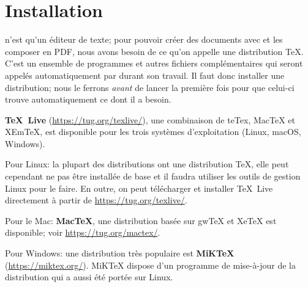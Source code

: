 
\chapter{Installation}
\label{chap.installation}

\Tw{} n'est qu'un éditeur de texte; pour pouvoir créer des documents avec \AllTeX{} et les composer en PDF, nous avons besoin de ce qu'on appelle une distribution \TeX{}. C'est un ensemble de programmes et autres fichiers complémentaires qui seront appelés automatiquement par \Tw{} durant son travail. Il faut donc installer une distribution; nous le ferrons \emph{avant} de lancer \Tw{} la première fois pour que celui-ci trouve automatiquement ce dont il a besoin.

\textbf{TeX~Live} (\url{https://tug.org/texlive/}), une combinaison de teTex, MacTeX et XEmTeX, est disponible pour les trois systèmes d'exploitation (Linux, macOS, Windows).

\begin{OSLinux}
Pour Linux: la plupart des distributions ont une distribution \TeX, elle peut cependant ne pas être installée de base et il faudra utiliser les outils de gestion Linux pour le faire. En outre, on peut télécharger et installer TeX~Live directement à partir de \url{https://tug.org/texlive/}.
\end{OSLinux}
\vspace{6pt} 

\begin{OSMac}
Pour le Mac: \textbf{MacTeX}, une distribution basée sur gwTeX et XeTeX est disponible; voir \url{https://tug.org/mactex/}.
\end{OSMac}
\vspace{6pt} 

\begin{OSWindows}
Pour Windows: une distribution très populaire est \textbf{MiKTeX} (\url{https://miktex.org/}). MiKTeX dispose d'un programme de mise-à-jour de la distribution qui a aussi été portée sur Linux.
\end{OSWindows}

